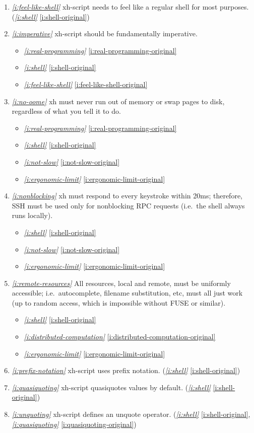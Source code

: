 \documentclass{report}
\makeatletter
\newcommand*{\Label}[2]{%
  \@bsphack
  \begingroup
    \label{#1-original}%
    \def\@currentlabel{#2}%
    \label{#1}%
  \endgroup
  \@esphack
}
\newcommand{\refboth}[1]{{\em \ref{#1}} \ref{#1-original}}
\makeatother
\begin{document}
\begin{enumerate}
\item{}\Label{i:feel-like-shell}{likeshell}{\em\ref{i:feel-like-shell}}
  xh-script needs to feel like a regular shell for most purposes.
(\refboth{i:shell})
\item{}\Label{i:imperative}{imperative}{\em\ref{i:imperative}}
  xh-script should be fundamentally imperative.
\begin{itemize}
\item \refboth{i:real-programming}
\item \refboth{i:shell}
\item \refboth{i:feel-like-shell}
\end{itemize}
\item{}\Label{i:no-oome}{no-oome}{\em\ref{i:no-oome}}
  xh must never run out of memory or swap pages to disk, regardless of what
  you tell it to do.
\begin{itemize}
\item \refboth{i:real-programming}
\item \refboth{i:shell}
\item \refboth{i:not-slow}
\item \refboth{i:ergonomic-limit}
\end{itemize}
\item{}\Label{i:nonblocking}{nonblock}{\em\ref{i:nonblocking}}
  xh must respond to every keystroke within 20ms; therefore, SSH must be
  used only for nonblocking RPC requests (i.e.~the shell always runs
  locally).
\begin{itemize}
\item \refboth{i:shell}
\item \refboth{i:not-slow}
\item \refboth{i:ergonomic-limit}
\end{itemize}
\item{}\Label{i:remote-resources}{remotestuff}{\em\ref{i:remote-resources}}
  All resources, local and remote, must be uniformly accessible;
  i.e.~autocomplete, filename substitution, etc, must all just work (up to
  random access, which is impossible without FUSE or similar).
\begin{itemize}
\item \refboth{i:shell}
\item \refboth{i:distributed-computation}
\item \refboth{i:ergonomic-limit}
\end{itemize}

\item{}\Label{i:prefix-notation}{prefix}{\em\ref{i:prefix-notation}}
  xh-script uses prefix notation.
(\refboth{i:shell})
\item{}\Label{i:quasiquoting}{quasiquote}{\em\ref{i:quasiquoting}}
  xh-script quasiquotes values by default.
(\refboth{i:shell})
\item{}\Label{i:unquoting}{unquote}{\em\ref{i:unquoting}}
  xh-script defines an unquote operator.
(\refboth{i:shell}, \refboth{i:quasiquoting})


\end{enumerate}
\end{document}
